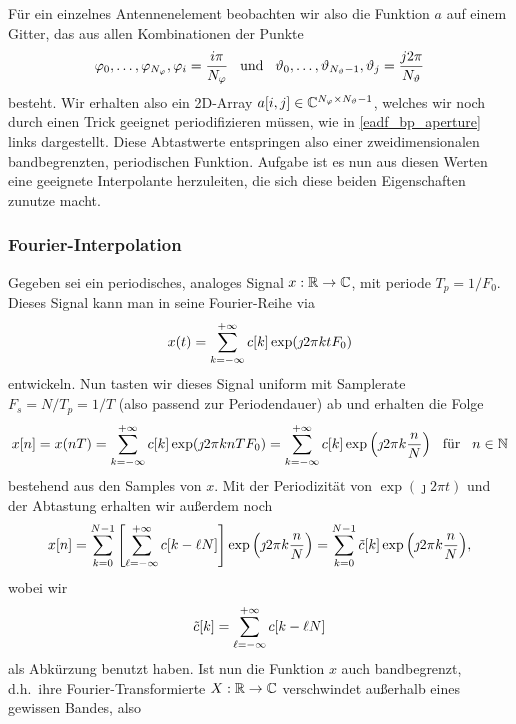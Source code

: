F\"ur ein einzelnes Antennenelement beobachten wir also die Funktion $a$ auf einem Gitter, das aus allen Kombinationen der Punkte 
\[
    \varphi_0, \dots, \varphi_{N_\varphi}, \varphi_i = \frac{i \pi}{N_\varphi}
    {\hspace{3mm} \text{und} \hspace{3mm}}
    \vartheta_0, \dots, \vartheta_{N_\vartheta-1}, \vartheta_j = \frac{j 2 \pi}{N_\vartheta}
\]
besteht. Wir erhalten also ein 2D-Array $a[i,j] \in \mathbb{C}^{N_\varphi \times N_\vartheta - 1}$, welches wir noch durch einen Trick geeignet periodifizieren m\"ussen, wie in \cref{eadf_bp_aperture} links dargestellt. Diese Abtastwerte entspringen also einer zweidimensionalen bandbegrenzten, periodischen Funktion. Aufgabe ist es nun aus diesen Werten eine geeignete Interpolante herzuleiten, die sich diese beiden Eigenschaften zunutze macht.
%
%
\subsubsection{Fourier-Interpolation}
%
%
Gegeben sei ein periodisches, analoges Signal $x: \mathbb{R} \rightarrow \mathbb{C}$, mit periode $T_p = 1/F_0$. Dieses Signal kann man in seine Fourier-Reihe via
\begin{equation}\label{fourier_series}
    x(t) = {\sum\limits_{k=-\infty}^{+\infty}{
        c[k] \exp(\jmath 2 \pi k t F_0) 
    }}
\end{equation}
entwickeln. Nun tasten wir dieses Signal uniform mit Samplerate $F_s = N/T_p = 1/T$ (also passend zur Periodendauer) ab und erhalten die Folge 
\begin{equation}
    x[n] = x(n T) = {\sum\limits_{k=-\infty}^{+\infty}{
        c[k] \exp(\jmath 2 \pi k n T F_0) 
    }} = {\sum\limits_{k=-\infty}^{+\infty}{
        c[k] \exp\left(\jmath 2 \pi k \frac nN\right) 
    }}
    {\hspace{3mm} \text{f\"ur} \hspace{3mm}}
    n \in \mathbb{N}
\end{equation}
bestehend aus den Samples von $x$. Mit der Periodizit\"at von $\exp(\jmath 2 \pi t)$ und der Abtastung erhalten wir au{\ss}erdem noch
\begin{equation}
    x[n] = {\sum\limits_{k=0}^{N-1}{
        \left[{\sum\limits_{\ell=-\infty}^{+\infty}{
            c[k - \ell N]
        }}\right] \exp\left(\jmath 2 \pi k \frac nN\right) 
    }} = {\sum\limits_{k=0}^{N-1}{
        \tilde{c}[k] \exp\left(\jmath 2 \pi k \frac nN\right) 
    }},
\end{equation}
wobei wir 
\begin{equation}\label{aliased_ck}
    \tilde{c}[k] = {\sum\limits_{\ell=-\infty}^{+\infty}{
        c[k - \ell N]
    }}
\end{equation}
als Abk\"urzung benutzt haben. Ist nun die Funktion $x$ auch bandbegrenzt, d.h.~ihre Fourier-Transformierte $X : \mathbb{R} \rightarrow \mathbb{C}$ verschwindet au{\ss}erhalb eines gewissen Bandes, also
